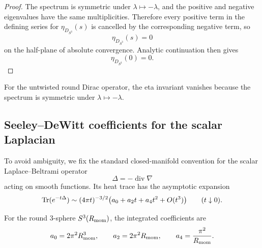 \documentclass[11pt]{article}
\begin{document}
\begin{proof}
The spectrum is symmetric under $\lambda\mapsto -\lambda$, and the positive and
negative eigenvalues have the same multiplicities. Therefore every positive
term in the defining series for $\eta_{D_{S^3}}(s)$ is cancelled by the
corresponding negative term, so
\[
\eta_{D_{S^3}}(s)=0
\]
on the half-plane of absolute convergence. Analytic continuation then gives
\[
\eta_{D_{S^3}}(0)=0.
\]
\end{proof}

\begin{remark}
For the untwisted round Dirac operator, the eta invariant vanishes because the spectrum is symmetric under \(\lambda\mapsto-\lambda\).
\end{remark}


\subsection{Seeley--DeWitt coefficients for the scalar Laplacian}
\label{p1:der:heat-coeffs}

To avoid ambiguity, we fix the standard closed-manifold convention for the scalar Laplace--Beltrami operator
\[
\Delta = -\operatorname{div}\nabla
\]
acting on smooth functions. Its heat trace has the asymptotic expansion
\[
\operatorname{Tr}(e^{-t\Delta})
\sim
(4\pi t)^{-3/2}\bigl(a_0 + a_2 t + a_4 t^2 + O(t^3)\bigr)
\qquad (t\downarrow 0).
\]

\begin{proposition}
\label{p1:prop:integrated-heat-coefficients-s3}
For the round \(3\)-sphere \(S^3(R_{\mathrm{mom}})\), the integrated coefficients are
\[
a_0 = 2\pi^2R_{\mathrm{mom}}^3,\qquad
a_2 = 2\pi^2R_{\mathrm{mom}},\qquad
a_4 = \frac{\pi^2}{R_{\mathrm{mom}}}.
\]
\end{proposition}
\end{document}
